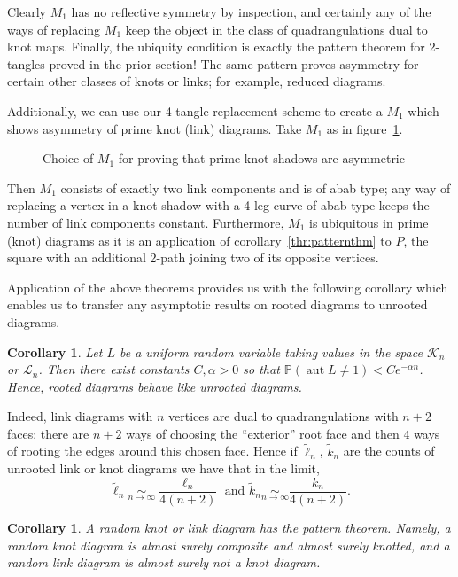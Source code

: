 \documentclass[amsmath,longbibliography,secnumarabic,floatfix,amssymb,nofootinbib,nobibnotes,letterpaper,11pt,tightenlines,notitlepage,showkeys,showlabels]{amsart}%
\newcommand{\KnotDia}{\mathcal{K}}
\newcommand{\LinkDia}{\mathcal{L}}
\newcommand{\Prb}{\mathbb{P}}
\DeclareMathOperator{\Aut}{aut}
\newtheorem{corollary}[theorem]{Corollary}
\theoremstyle{definition}
\begin{document}
Clearly $M_1$ has no reflective symmetry by inspection, and certainly
any of the ways of replacing $M_1$ keep the object in the class of
quadrangulations dual to knot maps. Finally, the ubiquity condition is
exactly the pattern theorem for 2-tangles proved in the prior section!
The same pattern proves asymmetry for certain other classes of knots
or links; for example, reduced diagrams.

Additionally, we can use our 4-tangle replacement scheme to create a
$M_1$ which shows asymmetry of prime knot (link) diagrams. Take $M_1$
as in figure~\ref{fig:primeknotasymm}.
\begin{figure}[h!]
  \centering
  
  \caption{Choice of $M_1$ for proving that prime knot shadows
    are asymmetric}
  \label{fig:primeknotasymm}
\end{figure}
Then $M_1$ consists of exactly two link components and is of abab
type; any way of replacing a vertex in a knot shadow with a 4-leg
curve of abab type keeps the number of link components
constant. Furthermore, $M_1$ is ubiquitous in prime (knot) diagrams as
it is an application of corollary~\ref{thr:patternthm} to $P$, the
square with an additional 2-path joining two of its opposite vertices.

Application of the above theorems provides us with the following corollary which enables us to
transfer any asymptotic results on rooted diagrams to unrooted diagrams.

\begin{corollary}
  Let $L$ be a uniform random variable taking values in the space $\KnotDia_n$ or $\LinkDia_n$. Then
  there exist constants $C, \alpha > 0$ so that $\Prb(\Aut L \ne 1) < Ce^{-\alpha n}$. Hence, rooted
  diagrams behave like unrooted diagrams.
\end{corollary}

Indeed, link diagrams with $n$ vertices are dual to quadrangulations with $n+2$ faces; there are
$n+2$ ways of choosing the ``exterior'' root face and then $4$ ways of rooting the edges around this
chosen face. Hence if $\tilde \ell_n$, $\tilde k_n$ are the counts of unrooted link or knot diagrams
we have that in the limit,
\[ \tilde\ell_n \underset{n\to\infty}{\sim} \frac{\ell_n}{4(n+2)} \text{ and } \tilde k_n
\underset{n\to\infty}{\sim} \frac{k_n}{4(n+2)}.\]

\begin{corollary}
  A random knot or link diagram has the pattern theorem. Namely, a random knot diagram is almost
  surely composite and almost surely knotted, and a random link diagram is almost surely not a knot
  diagram.
\end{corollary}
\end{document}
